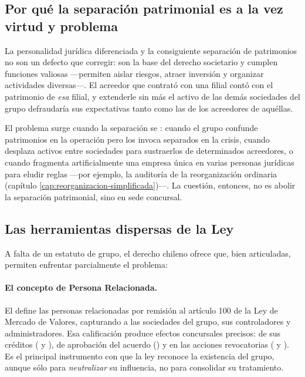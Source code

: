 \subsection{Por qué la separación patrimonial es a la vez virtud y problema}

La personalidad jurídica diferenciada y la consiguiente separación de patrimonios no son un defecto
que corregir: son la base del derecho societario y cumplen funciones valiosas ---permiten aislar
riesgos, atraer inversión y organizar actividades diversas---. El acreedor que contrató con una
filial contó con el patrimonio de \emph{esa} filial, y extenderle sin más el activo de las demás
sociedades del grupo defraudaría sus expectativas tanto como las de los acreedores de aquéllas.

El problema surge cuando la separación se : cuando el grupo confunde
patrimonios en la operación pero los invoca separados en la crisis, cuando desplaza activos entre
sociedades para sustraerlos de determinados acreedores, o cuando fragmenta artificialmente una
empresa única en varias personas jurídicas para eludir reglas ---por ejemplo, la auditoría de la
reorganización ordinaria (capítulo \ref{cap:reorganizacion-simplificada})---. La cuestión, entonces,
no es abolir la separación patrimonial, sino  en sede concursal.

\bloqueNormativo

\subsection{Las herramientas dispersas de la Ley }

A falta de un estatuto de grupo, el derecho chileno ofrece  que, bien
articuladas, permiten enfrentar parcialmente el problema:

\paragraph{El concepto de Persona Relacionada.} El   define las personas relacionadas
por remisión al artículo 100 de la Ley  de Mercado de Valores, capturando a las
sociedades del grupo, sus controladores y administradores. Esa calificación produce efectos
concursales precisos:  de sus créditos ( y ),
 de aprobación del acuerdo () y  en
las acciones revocatorias ( y ). Es el principal instrumento con que la ley
reconoce la existencia del grupo, aunque sólo para \emph{neutralizar} su influencia, no para
consolidar su tratamiento.

